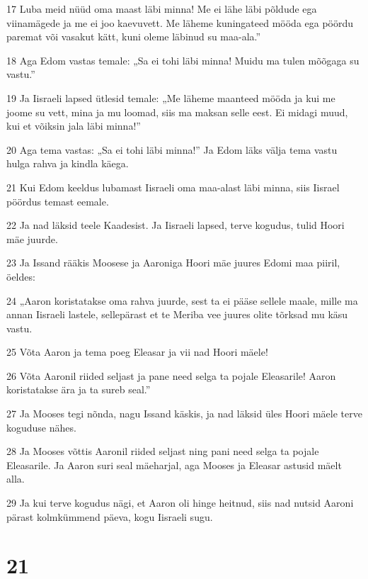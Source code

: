 \par 17 Luba meid nüüd oma maast läbi minna! Me ei lähe läbi põldude ega viinamägede ja me ei joo kaevuvett. Me läheme kuningateed mööda ega pöördu paremat või vasakut kätt, kuni oleme läbinud su maa-ala.”
\par 18 Aga Edom vastas temale: „Sa ei tohi läbi minna! Muidu ma tulen mõõgaga su vastu.”
\par 19 Ja Iisraeli lapsed ütlesid temale: „Me läheme maanteed mööda ja kui me joome su vett, mina ja mu loomad, siis ma maksan selle eest. Ei midagi muud, kui et võiksin jala läbi minna!”
\par 20 Aga tema vastas: „Sa ei tohi läbi minna!” Ja Edom läks välja tema vastu hulga rahva ja kindla käega.
\par 21 Kui Edom keeldus lubamast Iisraeli oma maa-alast läbi minna, siis Iisrael pöördus temast eemale.
\par 22 Ja nad läksid teele Kaadesist. Ja Iisraeli lapsed, terve kogudus, tulid Hoori mäe juurde.
\par 23 Ja Issand rääkis Moosese ja Aaroniga Hoori mäe juures Edomi maa piiril, öeldes:
\par 24 „Aaron koristatakse oma rahva juurde, sest ta ei pääse sellele maale, mille ma annan Iisraeli lastele, sellepärast et te Meriba vee juures olite tõrksad mu käsu vastu.
\par 25 Võta Aaron ja tema poeg Eleasar ja vii nad Hoori mäele!
\par 26 Võta Aaronil riided seljast ja pane need selga ta pojale Eleasarile! Aaron koristatakse ära ja ta sureb seal.”
\par 27 Ja Mooses tegi nõnda, nagu Issand käskis, ja nad läksid üles Hoori mäele terve koguduse nähes.
\par 28 Ja Mooses võttis Aaronil riided seljast ning pani need selga ta pojale Eleasarile. Ja Aaron suri seal mäeharjal, aga Mooses ja Eleasar astusid mäelt alla.
\par 29 Ja kui terve kogudus nägi, et Aaron oli hinge heitnud, siis nad nutsid Aaroni pärast kolmkümmend päeva, kogu Iisraeli sugu.

\chapter{21}

